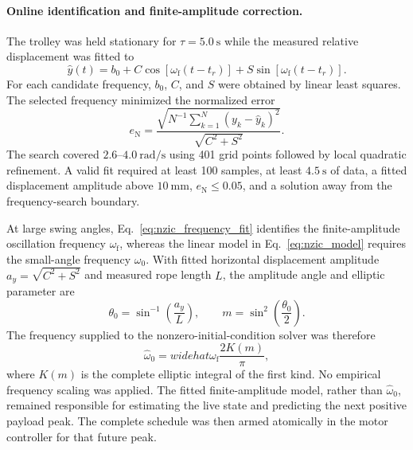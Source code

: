 \paragraph{Online identification and finite-amplitude correction.}
The trolley was held stationary for $\tau=5.0~\mathrm{s}$ while the measured
relative displacement was fitted to
\begin{equation}
    \widehat{y}(t)=b_0+C\cos\!\left[\omega_{\mathrm f}(t-t_r)\right]
    +S\sin\!\left[\omega_{\mathrm f}(t-t_r)\right].
    \label{eq:nzic_frequency_fit}
\end{equation}
For each candidate frequency, $b_0$, $C$, and $S$ were obtained by linear
least squares.  The selected frequency minimized the normalized error
\begin{equation}
    e_{\mathrm N}=\frac{
    \sqrt{N^{-1}\sum_{k=1}^{N}\left(y_k-\widehat{y}_k\right)^2}}
    {\sqrt{C^2+S^2}}.
    \label{eq:nzic_nrmse}
\end{equation}
The search covered $2.6$--$4.0~\mathrm{rad/s}$ using 401 grid points followed
by local quadratic refinement.  A valid fit required at least 100 samples,
at least $4.5~\mathrm{s}$ of data, a fitted displacement amplitude above
$10~\mathrm{mm}$, $e_{\mathrm N}\leq0.05$, and a solution away from the
frequency-search boundary.

At large swing angles, Eq.~\eqref{eq:nzic_frequency_fit} identifies the
finite-amplitude oscillation frequency $\omega_{\mathrm f}$, whereas the
linear model in Eq.~\eqref{eq:nzic_model} requires the small-angle frequency
$\omega_0$.  With fitted horizontal displacement amplitude
$a_y=\sqrt{C^2+S^2}$ and measured rope length $L$, the amplitude angle and
elliptic parameter are
\begin{equation}
    \theta_0=\sin^{-1}\!\left(\frac{a_y}{L}\right),\qquad
    m=\sin^2\!\left(\frac{\theta_0}{2}\right).
\end{equation}
The frequency supplied to the nonzero-initial-condition solver was therefore
\begin{equation}
    \widehat{\omega}_0=widehat{\omega}_{\mathrm f}
    \frac{2K(m)}{\pi},
    \label{eq:nzic_finite_amplitude_correction}
\end{equation}
where $K(m)$ is the complete elliptic integral of the first kind.  No
empirical frequency scaling was applied.  The fitted finite-amplitude model,
rather than $\widehat{\omega}_0$, remained responsible for estimating the live
state and predicting the next positive payload peak.  The complete schedule
was then armed atomically in the motor controller for that future peak.

